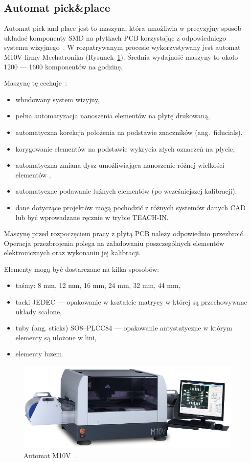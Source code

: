 \newpage{}
\subsection{Automat pick\&place}
Automat pick and place jest to maszyna, która umożliwia w precyzyjny sposób układać komponenty SMD na płytkach PCB korzystając z odpowiedniego systemu wizyjnego~\cite{automatp&p1}. W rozpatrywanym procesie wykorzystywany jest automat M10V firmy Mechatronika (Rysunek~\ref{automat_pick_place}). Średnia wydajność maszyny to około 1200 --- 1600 komponentów na godzinę.

\breakparagraph{}
Maszynę tę cechuje~\cite{automatp&p2}:
\begin{itemize}
	\item wbudowany system wizyjny,
	\item pełna automatyzacja nanoszenia elementów na płytę drukowaną,
	\item automatyczna korekcja położenia na podstawie znaczników (ang.\ fiducials),
	\item korygowanie elementów na podstawie wykrycia złych oznaczeń na płycie,
	\item automatyczna zmiana dysz umożliwiająca nanoszenie różnej wielkości elementów ,
	\item automatyczne podawanie luźnych elementów (po wcześniejszej kalibracji),
	\item dane dotyczące projektów mogą pochodzić z różnych systemów danych CAD lub być wprowadzane ręcznie w trybie TEACH-IN\@.
\end{itemize}

Maszynę przed rozpoczęciem pracy z płytą PCB należy odpowiednio przezbroić. Operacja przezbrojenia polega na załadowaniu poszczególnych elementów elektronicznych oraz wykonaniu jej kalibracji.

\breakparagraph{}
Elementy mogą być dostarczane na kilka sposobów:
\begin{itemize}
	\item taśmy: 8 mm, 12 mm, 16 mm, 24 mm, 32 mm, 44 mm,
	\item tacki JEDEC --- opakowanie w kształcie matrycy w której są przechowywane układy scalone,
	\item tuby (ang. sticks) SO8–PLCC84 --- opakowanie antystatyczne w którym elementy są ułożone w lini,
	\item elementy luzem.
\end{itemize}

\begin{figure}[H]
	\centering
	\includegraphics[scale=0.45]{./chapters/chapter2/M10V.jpeg}
	\caption{Automat M10V~\cite{automatp&p2}.}
	\label{automat_pick_place}
\end{figure}


